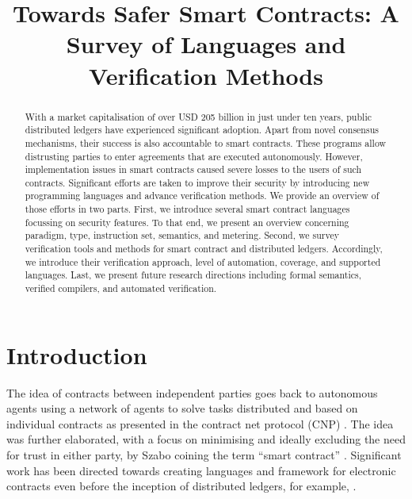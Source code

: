 \documentclass{llncs}
\begin{document}
\title{Towards Safer Smart Contracts: A Survey of Languages and Verification Methods}



\maketitle

\begin{abstract}
With a market capitalisation of over USD 205 billion in just under ten years, public distributed ledgers have experienced significant adoption.
Apart from novel consensus mechanisms, their success is also accountable to smart contracts. 
These programs allow distrusting parties to enter agreements that are executed autonomously.
However, implementation issues in smart contracts caused severe losses to the users of such contracts.
Significant efforts are taken to improve their security by introducing new programming languages and advance verification methods.
We provide an overview of those efforts in two parts.
First, we introduce several smart contract languages focussing on security features.
To that end, we present an overview concerning paradigm, type, instruction set, semantics, and metering.
Second, we survey verification tools and methods for smart contract and distributed ledgers. 
Accordingly, we introduce their verification approach, level of automation, coverage, and supported languages.
Last, we present future research directions including formal semantics, verified compilers, and automated verification.
\end{abstract}

\section{Introduction}
The idea of contracts between independent parties goes back to autonomous agents using a network of agents to solve tasks distributed and based on individual contracts as presented in the contract net protocol (CNP) \cite{Smith1980}.
The idea was further elaborated, with a focus on minimising and ideally excluding the need for trust in either party, by Szabo coining the term ``smart contract'' \cite{Szabo1997}.
Significant work has been directed towards creating languages and framework for electronic contracts even before the inception of distributed ledgers, for example, \cite{Andersen2006,Kyas2008,Xu2004}.
\end{document}
